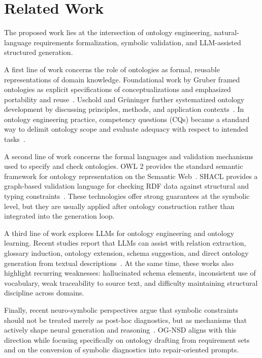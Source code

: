 \section{Related Work}

The proposed work lies at the intersection of ontology engineering, natural-language requirements formalization, symbolic validation, and LLM-assisted structured generation.

A first line of work concerns the role of ontologies as formal, reusable representations of domain knowledge. Foundational work by Gruber framed ontologies as explicit specifications of conceptualizations and emphasized portability and reuse~\cite{gruber1993}. Uschold and Gr{\"u}ninger further systematized ontology development by discussing principles, methods, and application contexts~\cite{uschold1996}. In ontology engineering practice, competency questions (CQs) became a standard way to delimit ontology scope and evaluate adequacy with respect to intended tasks~\cite{gruninger1995,monfardini2023}.

A second line of work concerns the formal languages and validation mechanisms used to specify and check ontologies. OWL 2 provides the standard semantic framework for ontology representation on the Semantic Web~\cite{owl2overview2012,owl2syntax2012}. SHACL provides a graph-based validation language for checking RDF data against structural and typing constraints~\cite{shacl2017}. These technologies offer strong guarantees at the symbolic level, but they are usually applied after ontology construction rather than integrated into the generation loop.

A third line of work explores LLMs for ontology engineering and ontology learning. Recent studies report that LLMs can assist with relation extraction, glossary induction, ontology extension, schema suggestion, and direct ontology generation from textual descriptions~\cite{garcia2024thesis,saeedizade2024,lippolis2024,garijo2025}. At the same time, these works also highlight recurring weaknesses: hallucinated schema elements, inconsistent use of vocabulary, weak traceability to source text, and difficulty maintaining structural discipline across domains.

Finally, recent neuro-symbolic perspectives argue that symbolic constraints should not be treated merely as post-hoc diagnostics, but as mechanisms that actively shape neural generation and reasoning~\cite{delong2024}. OG-NSD aligns with this direction while focusing specifically on ontology drafting from requirement sets and on the conversion of symbolic diagnostics into repair-oriented prompts.
